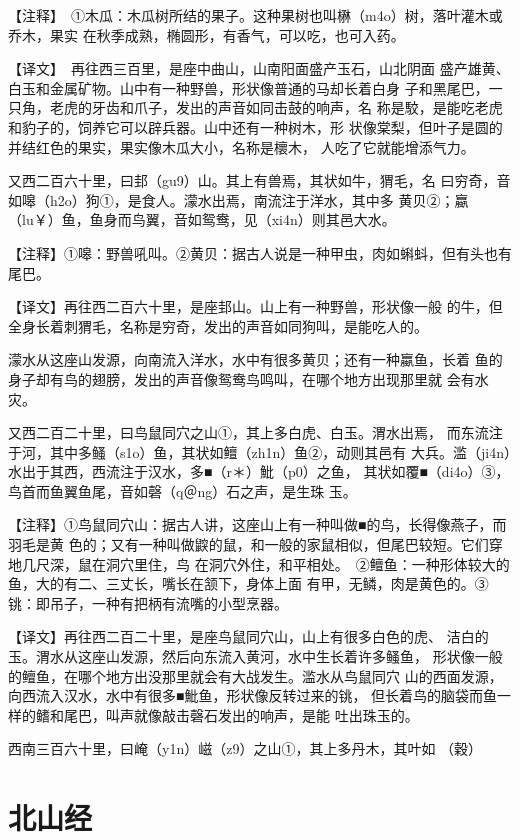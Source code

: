 \documentclass[a4paper,12pt,UTF8,twoside]{ctexbook}
\begin{document}
【注释】　①木瓜：木瓜树所结的果子。这种果树也叫楙（m4o）树，落叶灌木或乔木，果实 在秋季成熟，椭圆形，有香气，可以吃，也可入药。

【译文】　再往西三百里，是座中曲山，山南阳面盛产玉石，山北阴面 盛产雄黄、白玉和金属矿物。山中有一种野兽，形状像普通的马却长着白身 子和黑尾巴，一只角，老虎的牙齿和爪子，发出的声音如同击鼓的响声，名 称是駮，是能吃老虎和豹子的，饲养它可以辟兵器。山中还有一种树木，形 状像棠梨，但叶子是圆的并结红色的果实，果实像木瓜大小，名称是櫰木， 人吃了它就能增添气力。

又西二百六十里，曰邽（gu9）山。其上有兽焉，其状如牛，猬毛，名 曰穷奇，音如嗥（h2o）狗①，是食人。濛水出焉，南流注于洋水，其中多 黄贝②；蠃（lu￥）鱼，鱼身而鸟翼，音如鸳鸯，见（xi4n）则其邑大水。

【注释】①嗥：野兽吼叫。②黄贝：据古人说是一种甲虫，肉如蝌蚪，但有头也有尾巴。

【译文】再往西二百六十里，是座邽山。山上有一种野兽，形状像一般 的牛，但全身长着刺猬毛，名称是穷奇，发出的声音如同狗叫，是能吃人的。

濛水从这座山发源，向南流入洋水，水中有很多黄贝；还有一种蠃鱼，长着 鱼的身子却有鸟的翅膀，发出的声音像鸳鸯鸟鸣叫，在哪个地方出现那里就 会有水灾。

又西二百二十里，曰鸟鼠同穴之山①，其上多白虎、白玉。渭水出焉， 而东流注于河，其中多鳋（s1o）鱼，其状如鳣（zh1n）鱼②，动则其邑有 大兵。滥（ji4n）水出于其西，西流注于汉水，多■（r＊）魮（p0）之鱼， 其状如覆■（di4o）③，鸟首而鱼翼鱼尾，音如磬（q＠ng）石之声，是生珠 玉。

【注释】①鸟鼠同穴山：据古人讲，这座山上有一种叫做■的鸟，长得像燕子，而羽毛是黄 色的；又有一种叫做鼵的鼠，和一般的家鼠相似，但尾巴较短。它们穿地几尺深，鼠在洞穴里住，鸟 在洞穴外住，和平相处。　②鳣鱼：一种形体较大的鱼，大的有二、三丈长，嘴长在颔下，身体上面 有甲，无鳞，肉是黄色的。③铫：即吊子，一种有把柄有流嘴的小型烹器。

【译文】再往西二百二十里，是座鸟鼠同穴山，山上有很多白色的虎、 洁白的玉。渭水从这座山发源，然后向东流入黄河，水中生长着许多鳋鱼， 形状像一般的鳣鱼，在哪个地方出没那里就会有大战发生。滥水从鸟鼠同穴 山的西面发源，向西流入汉水，水中有很多■魮鱼，形状像反转过来的铫， 但长着鸟的脑袋而鱼一样的鳍和尾巴，叫声就像敲击磬石发出的响声，是能 吐出珠玉的。

西南三百六十里，曰崦（y1n）嵫（z9）之山①，其上多丹木，其叶如 （穀）

\chapter{北山经}
\end{document}
